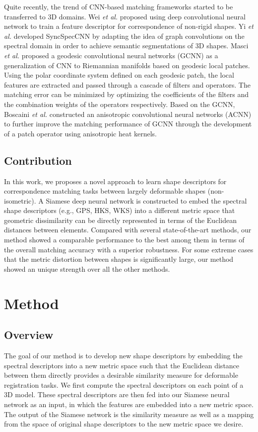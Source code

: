 \documentclass[5p,twocolumn,10pt,times]{elsarticle}
\begin{document}
Quite recently, the trend of CNN-based matching frameworks started to be transferred to 3D domains. Wei \textit{et al.} \cite{wei2016dense} proposed using deep convolutional neural network to train a feature descriptor for correspondence of non-rigid shapes. Yi \textit{et al.} \cite{yi2016syncspeccnn} developed SyncSpecCNN by adapting the idea of graph convolutions on the spectral domain in order to achieve semantic segmentations of 3D shapes. Masci \textit{et al.} \cite{Masci_2015_ICCV_Workshops} proposed a geodesic convolutional neural networks (GCNN) as a generalization of CNN to Riemannian manifolds based on geodesic local patches. Using the polar coordinate system defined on each geodesic patch, the local features are extracted and passed through a cascade of filters and operators. The matching error can be minimized by optimizing the coefficients of the filters and the combination weights of the operators respectively. Based on the GCNN, Boscaini \textit{et al.} \cite{boscaini2016learning} constructed an  anisotropic convolutional neural networks (ACNN) to further improve the matching performance of GCNN through the development of a patch operator using anisotropic heat kernels. 

\subsection{Contribution}
In this work, we proposes a novel approach to learn shape descriptors for correspondence matching tasks between largely deformable shapes (non-isometric). A Siamese deep neural network is constructed to embed the spectral shape descriptors (e.g., GPS, HKS, WKS) into a different metric space that geometric dissimilarity can be directly represented in terms of the Euclidean distances between elements. Compared with several state-of-the-art methods, our method showed a comparable performance to the best among them in terms of the overall matching accuracy with a superior robustness. For some extreme cases that the metric distortion between shapes is significantly large, our method showed an unique strength over all the other methods.

\section{Method}
\label{sec:2}
\subsection{Overview}
The goal of our method is to develop new shape descriptors by embedding the spectral descriptors into a new metric space such that the Euclidean distance between them directly provides a desirable similarity measure for deformable registration tasks. We first compute the spectral descriptors on each point of a 3D model. These spectral descriptors are then fed into our Siamese neural network as an input, in which the features are embedded into a new metric space. The output of the Siamese network is the similarity measure as well as a mapping from the space of original shape descriptors to the new metric space we desire.
\end{document}
